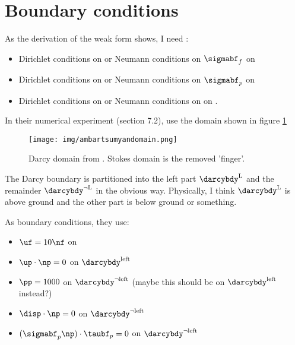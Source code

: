 \documentclass{article}
\begin{document}
\section{Boundary conditions}
As the derivation of the weak form shows, I need :
\begin{itemize}
\item Dirichlet conditions on \uf or Neumann conditions on
  $\sigmabf_f$ on \stokesbdy
\item Dirichlet conditions on \disp or Neumann %
  conditions on $\sigmabf_p$ on \darcybdy
\item Dirichlet conditions on
  \up or Neumann conditions on \pp on \darcybdy.
\end{itemize}


In their numerical experiment (section 7.2), \cite{ambartsumyan} use the domain shown in figure \ref{fig:ambartsumyandomain}
\begin{figure}[h]
  \centering
  \texttt{[image: img/ambartsumyandomain.png]}
  \label{fig:ambartsumyandomain}
  \caption{Darcy domain from \cite{ambartsumyan}. Stokes domain is the removed 'finger'.}
\end{figure}
The Darcy boundary \darcybdy is partitioned into the left part $\darcybdy^{\text{L}}$ and the remainder $\darcybdy^{\neg \text{L}}$ in the obvious way. Physically, I think $\darcybdy^{\text{L}}$ is above ground and the other part is below ground or something.

As boundary conditions, they use:
\begin{itemize}
\item $\uf = 10 \nf$ on \stokesbdy
\item $\up \cdot \np = 0$ on $\darcybdy^{\text{left}}$
\item $\pp = 1000$ on $\darcybdy^{\neg \text{left}}$ (maybe this should be on $\darcybdy^{\text{left}}$ instead?)
\item $\disp \cdot \np = 0$ on $\darcybdy^{\neg \text{left}}$
\item $(\sigmabf_p \np) \cdot \taubf_p = 0$ on $\darcybdy^{\neg \text{left}}$


 
\end{itemize}
\end{document}
